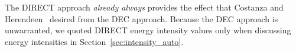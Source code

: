The DIRECT approach \emph{already always} provides 
the effect that Costanza and Herendeen~\cite{Costanza:1984tq}
desired from the DEC approach. 
Because the DEC approach is unwarranted, 
we quoted DIRECT energy intensity values only
when discussing energy intensities in 
Section~\ref{sec:intensity_auto}.








%
%




